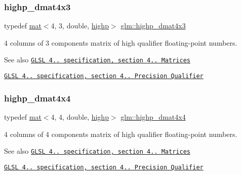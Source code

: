 \subsubsection{\texorpdfstring{highp\+\_\+dmat4x3}{highp\_dmat4x3}}
{\footnotesize\ttfamily typedef \hyperlink{structglm_1_1mat}{mat}$<$4, 3, double, \hyperlink{namespaceglm_a36ed105b07c7746804d7fdc7cc90ff25ac6f7eab42eacbb10d59a58e95e362074}{highp}$>$ \hyperlink{group__core__precision_ga9a5dab260df6e8c46c747bac0b8d2f38}{glm\+::highp\+\_\+dmat4x3}}

4 columns of 3 components matrix of high qualifier floating-\/point numbers.

\begin{DoxySeeAlso}{See also}
\href{http://www.opengl.org/registry/doc/GLSLangSpec.4.20.8.pdf}{\tt G\+L\+SL 4.. specification, section 4.. Matrices} 

\href{http://www.opengl.org/registry/doc/GLSLangSpec.4.20.8.pdf}{\tt G\+L\+SL 4.. specification, section 4.. Precision Qualifier} 
\end{DoxySeeAlso}
\mbox{\label{group__core__precision_gad3df38df8c4f7ef9b38f03581ff60142}} 
\subsubsection{\texorpdfstring{highp\+\_\+dmat4x4}{highp\_dmat4x4}}
{\footnotesize\ttfamily typedef \hyperlink{structglm_1_1mat}{mat}$<$4, 4, double, \hyperlink{namespaceglm_a36ed105b07c7746804d7fdc7cc90ff25ac6f7eab42eacbb10d59a58e95e362074}{highp}$>$ \hyperlink{group__core__precision_gad3df38df8c4f7ef9b38f03581ff60142}{glm\+::highp\+\_\+dmat4x4}}

4 columns of 4 components matrix of high qualifier floating-\/point numbers.

\begin{DoxySeeAlso}{See also}
\href{http://www.opengl.org/registry/doc/GLSLangSpec.4.20.8.pdf}{\tt G\+L\+SL 4.. specification, section 4.. Matrices} 

\href{http://www.opengl.org/registry/doc/GLSLangSpec.4.20.8.pdf}{\tt G\+L\+SL 4.. specification, section 4.. Precision Qualifier} 
\end{DoxySeeAlso}
\mbox{\label{group__core__precision_gadec51e8e57b72d8fc95e87f18d1ad4dd}} 
